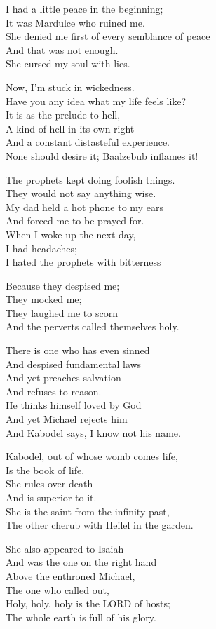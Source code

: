 \documentclass[
]{book}
\begin{document}
I had a little peace in the beginning;\\
It was Mardulce who ruined me.\\
She denied me first of every semblance of peace\\
And that was not enough.\\
She cursed my soul with lies.

Now, I'm stuck in wickedness.\\
Have you any idea what my life feels like?\\
It is as the prelude to hell,\\
A kind of hell in its own right\\
And a constant distasteful experience.\\
None should desire it;
Baalzebub inflames it!

The prophets kept doing foolish things.\\
They would not say anything wise.\\
My dad held a hot phone to my ears\\
And forced me to be prayed for.\\
When I woke up the next day,\\
I had headaches;\\
I hated the prophets with bitterness

Because they despised me;\\
They mocked me;\\
They laughed me to scorn\\
And the perverts called themselves holy.

There is one who has even sinned\\
And despised fundamental laws\\
And yet preaches salvation\\
And refuses to reason.\\
He thinks himself loved by God\\
And yet Michael rejects him\\
And Kabodel says, I know not his name.

Kabodel, out of whose womb comes life,\\
Is the book of life.\\
She rules over death\\
And is superior to it.\\
She is the saint from the infinity past,\\
The other cherub with Heilel in the garden.

She also appeared to Isaiah\\
And was the one on the right hand\\
Above the enthroned Michael,\\
The one who called out,\\
Holy, holy, holy is the LORD of hosts;\\
The whole earth is full of his glory.
\end{document}
